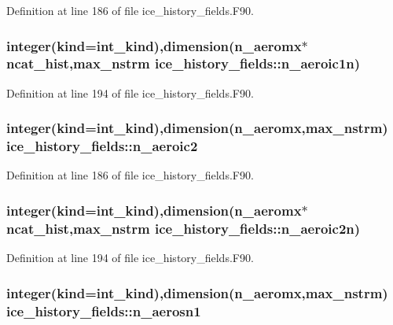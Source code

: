 Definition at line 186 of file ice\_\-history\_\-fields.F90.\hypertarget{namespaceice__history__fields_aa77dba4dfa1d45de1f64c6ae28e7b370}{
\subsubsection[{n\_\-aeroic1n}]{\setlength{\rightskip}{0pt plus 5cm}integer(kind=int\_\-kind),dimension(n\_\-aeromx$\ast${\bf ncat\_\-hist},max\_\-nstrm {\bf ice\_\-history\_\-fields::n\_\-aeroic1n})}}
\label{namespaceice__history__fields_aa77dba4dfa1d45de1f64c6ae28e7b370}


Definition at line 194 of file ice\_\-history\_\-fields.F90.\hypertarget{namespaceice__history__fields_ac48a9741b1cf192db287c558cb4fadb4}{
\subsubsection[{n\_\-aeroic2}]{\setlength{\rightskip}{0pt plus 5cm}integer(kind=int\_\-kind),dimension(n\_\-aeromx,max\_\-nstrm) {\bf ice\_\-history\_\-fields::n\_\-aeroic2}}}
\label{namespaceice__history__fields_ac48a9741b1cf192db287c558cb4fadb4}


Definition at line 186 of file ice\_\-history\_\-fields.F90.\hypertarget{namespaceice__history__fields_a96d44e16cfbb40e84bad71a4f084c9a6}{
\subsubsection[{n\_\-aeroic2n}]{\setlength{\rightskip}{0pt plus 5cm}integer(kind=int\_\-kind),dimension(n\_\-aeromx$\ast${\bf ncat\_\-hist},max\_\-nstrm {\bf ice\_\-history\_\-fields::n\_\-aeroic2n})}}
\label{namespaceice__history__fields_a96d44e16cfbb40e84bad71a4f084c9a6}


Definition at line 194 of file ice\_\-history\_\-fields.F90.\hypertarget{namespaceice__history__fields_afb0db2f3c0c14963f02057fbc84887bc}{
\subsubsection[{n\_\-aerosn1}]{\setlength{\rightskip}{0pt plus 5cm}integer(kind=int\_\-kind),dimension(n\_\-aeromx,max\_\-nstrm) {\bf ice\_\-history\_\-fields::n\_\-aerosn1}}}
\label{namespaceice__history__fields_afb0db2f3c0c14963f02057fbc84887bc}



